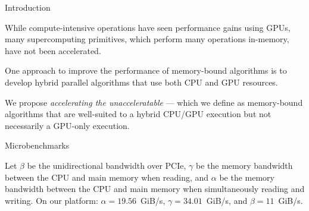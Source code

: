 \documentclass[final]{beamer}
\newlength{\colwidth}
\begin{document}
\begin{frame}[t]
\begin{columns}[t]
\begin{column}{\colwidth}
\begin{block}{Introduction}
\begin{description}[font=$\bullet$~\normalfont\scshape\color{red!50!black}]
\item While compute-intensive operations have seen performance gains using GPUs, many supercomputing primitives, which perform many operations in-memory, have not been accelerated. 

\item One approach to improve the performance of memory-bound algorithms is to develop hybrid parallel algorithms that use both CPU and GPU resources.


\item We propose \emph{accelerating the unacceleratable} --- which we define as memory-bound algorithms that are well-suited to a hybrid CPU/GPU execution but not necessarily a GPU-only execution. 


\end{description}  

  \end{block}

\begin{alertblock}{Microbenchmarks}
 
\begin{description}[font=$\bullet$~\normalfont\scshape\color{red!50!black}]

\item Let $\beta$ be the unidirectional bandwidth over PCIe, $\gamma$ be the memory bandwidth between the CPU and main memory when reading, and $\alpha$ be the memory bandwidth between the CPU and main memory when simultaneously reading and writing. On our platform: $\alpha=19.56$~GiB/s, $\gamma=34.01$~GiB/s, and $\beta=11$~GiB/s.


\end{description}
\end{alertblock}
\end{column}
\end{columns}
\end{frame}
\end{document}
